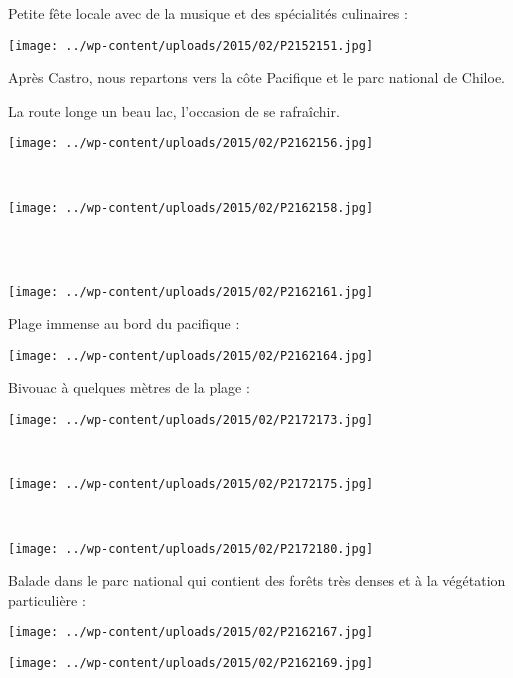 \pagebreak
 Petite fête locale avec de la musique et des spécialités culinaires :
\begin{center} \texttt{[image: ../wp-content/uploads/2015/02/P2152151.jpg]} \end{center}

 Après Castro, nous repartons vers la côte Pacifique et le parc national de Chiloe.

 La route longe un beau lac, l'occasion de se rafraîchir.
\begin{center} \texttt{[image: ../wp-content/uploads/2015/02/P2162156.jpg]} \end{center}
\vspace{-\topsep}

\pagebreak
~
\begin{center} \texttt{[image: ../wp-content/uploads/2015/02/P2162158.jpg]} \end{center}
~\\

~
\begin{center} \texttt{[image: ../wp-content/uploads/2015/02/P2162161.jpg]} \end{center}
\vspace{-\topsep}

\pagebreak
 Plage immense au bord du pacifique :
\begin{center} \texttt{[image: ../wp-content/uploads/2015/02/P2162164.jpg]} \end{center}

 Bivouac à quelques mètres de la plage :
\begin{center} \texttt{[image: ../wp-content/uploads/2015/02/P2172173.jpg]} \end{center}
\vspace{-\topsep}

\pagebreak
~
\begin{center} \texttt{[image: ../wp-content/uploads/2015/02/P2172175.jpg]} \end{center}
~
\begin{center} \texttt{[image: ../wp-content/uploads/2015/02/P2172180.jpg]} \end{center}
\vspace{-\topsep}

\pagebreak
 Balade dans le parc national qui contient des forêts très denses et à la végétation particulière :
\begin{center} \texttt{[image: ../wp-content/uploads/2015/02/P2162167.jpg]} \end{center}
\begin{center} \texttt{[image: ../wp-content/uploads/2015/02/P2162169.jpg]} \end{center}
\vspace{-\topsep}
\vspace{-3mm}

